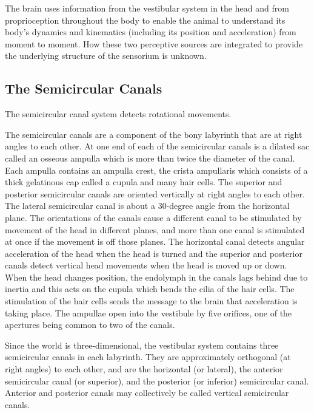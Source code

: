 The brain uses information from the vestibular system in the head and from proprioception throughout the body to enable the animal to understand its body's dynamics and kinematics (including its position and acceleration) from moment to moment. How these two perceptive sources are integrated to provide the underlying structure of the sensorium is unknown.

\hypertarget{the-semicircular-canals}{%
\subsection{The Semicircular Canals}\label{the-semicircular-canals}}

The semicircular canal system detects rotational movements.

The semicircular canals are a component of the bony labyrinth that are at right angles to each other. At one end of each of the semicircular canals is a dilated sac called an osseous ampulla which is more than twice the diameter of the canal. Each ampulla contains an ampulla crest, the crista ampullaris which consists of a thick gelatinous cap called a cupula and many hair cells. The superior and posterior semicircular canals are oriented vertically at right angles to each other. The lateral semicircular canal is about a 30-degree angle from the horizontal plane. The orientations of the canals cause a different canal to be stimulated by movement of the head in different planes, and more than one canal is stimulated at once if the movement is off those planes. The horizontal canal detects angular acceleration of the head when the head is turned and the superior and posterior canals detect vertical head movements when the head is moved up or down. When the head changes position, the endolymph in the canals lags behind due to inertia and this acts on the cupula which bends the cilia of the hair cells. The stimulation of the hair cells sends the message to the brain that acceleration is taking place. The ampullae open into the vestibule by five orifices, one of the apertures being common to two of the canals.

Since the world is three-dimensional, the vestibular system contains three semicircular canals in each labyrinth. They are approximately orthogonal (at right angles) to each other, and are the horizontal (or lateral), the anterior semicircular canal (or superior), and the posterior (or inferior) semicircular canal. Anterior and posterior canals may collectively be called vertical semicircular canals.

